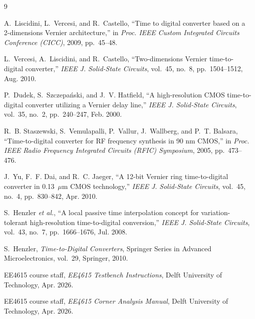 \documentclass[11pt,a4paper]{article}
\begin{document}
\vspace{0.5em}








\begin{thebibliography}{9}
\small

A.~Liscidini, L.~Vercesi, and R.~Castello,
``Time to digital converter based on a 2-dimensions Vernier architecture,''
in \emph{Proc. IEEE Custom Integrated Circuits Conference (CICC)}, 2009, pp.~45--48.

L.~Vercesi, A.~Liscidini, and R.~Castello,
``Two-dimensions Vernier time-to-digital converter,''
\emph{IEEE J. Solid-State Circuits}, vol.~45, no.~8, pp.~1504--1512, Aug. 2010.

P.~Dudek, S.~Szczepa\'nski, and J.~V. Hatfield,
``A high-resolution CMOS time-to-digital converter utilizing a Vernier delay line,''
\emph{IEEE J. Solid-State Circuits}, vol.~35, no.~2, pp.~240--247, Feb. 2000.

R.~B. Staszewski, S.~Vemulapalli, P.~Vallur, J.~Wallberg, and P.~T. Balsara,
``Time-to-digital converter for RF frequency synthesis in 90 nm CMOS,''
in \emph{Proc. IEEE Radio Frequency Integrated Circuits (RFIC) Symposium}, 2005,
pp.~473--476.

J.~Yu, F.~F. Dai, and R.~C. Jaeger,
``A 12-bit Vernier ring time-to-digital converter in 0.13~$\mu$m CMOS technology,''
\emph{IEEE J. Solid-State Circuits}, vol.~45, no.~4, pp.~830--842, Apr. 2010.

S.~Henzler \emph{et al.},
``A local passive time interpolation concept for variation-tolerant high-resolution
time-to-digital conversion,''
\emph{IEEE J. Solid-State Circuits}, vol.~43, no.~7, pp.~1666--1676, Jul. 2008.

S.~Henzler, \emph{Time-to-Digital Converters},
Springer Series in Advanced Microelectronics, vol.~29, Springer, 2010.

EE4615 course staff, \emph{EE4615 Testbench Instructions}, Delft University of
Technology, Apr. 2026.

EE4615 course staff, \emph{EE4615 Corner Analysis Manual}, Delft University of
Technology, Apr. 2026.

\end{thebibliography}

\appendix

\end{document}
